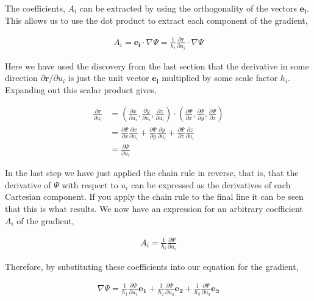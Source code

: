 \documentclass[11pt]{amsart}
\begin{document}
The coefficients, $A_i$ can be extracted by using the orthogonality of the vectors $\mathbf{e_i}$. This allows us to use the dot product to extract each component of the gradient,

\begin{align*}
  A_i = \mathbf{e_i} \cdot \nabla\Psi = \frac{1}{h_i} \frac{\partial\mathbf{r}}{\partial u_i} \cdot \nabla\Psi
\end{align*}

Here we have used the discovery from the last section that the derivative in some direction $\partial\mathbf{r}/\partial u_i$ is just the unit vector $\mathbf{e_i}$ multiplied by some scale factor $h_i$. Expanding out this scalar product gives,

\begin{align*}
  \frac{\partial\mathbf{r}}{\partial u_i} &= \left(\frac{\partial x}{\partial u_i}, \frac{\partial y}{\partial u_i}, \frac{\partial z}{\partial u_i}\right) \cdot \left(\frac{\partial\Psi}{\partial x}, \frac{\partial\Psi}{\partial y}, \frac{\partial\Psi}{\partial z}\right) \\
                                          &= \frac{\partial\Psi}{\partial x} \frac{\partial x}{\partial u_i} + \frac{\partial\Psi}{\partial y} \frac{\partial y}{\partial u_i} + \frac{\partial\Psi}{\partial z} \frac{\partial z}{\partial u_i} \\
                                          &= \frac{\partial\Psi}{\partial u_i}
\end{align*}

In the last step we have just applied the chain rule in reverse, that is, that the derivative of $\Psi$ with respect to $u_i$ can be expressed as the derivatives of each Cartesian component. If you apply the chain rule to the final line it can be seen that this is what results. We now have an expression for an arbitrary coefficient $A_i$ of the gradient,

\begin{align*}
  A_i = \frac{1}{h_i} \frac{\partial\Psi}{\partial u_i}
\end{align*}

Therefore, by substituting these coefficients into our equation for the gradient,

\begin{align*}
  \nabla\Psi = \frac{1}{h_1}\frac{\partial\Psi}{\partial u_1} \mathbf{e_1} + \frac{1}{h_2}\frac{\partial\Psi}{\partial u_2} \mathbf{e_2} + \frac{1}{h_3}\frac{\partial\Psi}{\partial u_3} \mathbf{e_3}
\end{align*}
\end{document}
